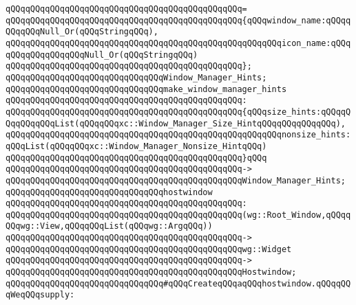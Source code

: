 \verb|qQQqqQQqqQQqqQQqqQQqqQQqqQQqqQQqqQQqqQQqqQQqqQQq=|\newline
\verb|qQQqqQQqqQQqqQQqqQQqqQQqqQQqqQQqqQQqqQQqqQQqqQQq{qQQqwindow_name:qQQqqQQqqQQqNull_Or(qQQqStringqQQq),|\newline
\verb|qQQqqQQqqQQqqQQqqQQqqQQqqQQqqQQqqQQqqQQqqQQqqQQqqQQqqQQqicon_name:qQQqqQQqqQQqqQQqqQQqNull_Or(qQQqStringqQQq)|\newline
\verb|qQQqqQQqqQQqqQQqqQQqqQQqqQQqqQQqqQQqqQQqqQQqqQQq};|\newline
\newline
\verb|qQQqqQQqqQQqqQQqqQQqqQQqqQQqqQQqWindow_Manager_Hints;|\newline
\newline
\verb|qQQqqQQqqQQqqQQqqQQqqQQqqQQqqQQqmake_window_manager_hints|\newline
\verb|qQQqqQQqqQQqqQQqqQQqqQQqqQQqqQQqqQQqqQQqqQQqqQQq:|\newline
\verb|qQQqqQQqqQQqqQQqqQQqqQQqqQQqqQQqqQQqqQQqqQQqqQQq{qQQqsize_hints:qQQqqQQqqQQqqQQqList(qQQqqQQqxc::Window_Manager_Size_HintqQQqqQQqqQQqqQQq),|\newline
\verb|qQQqqQQqqQQqqQQqqQQqqQQqqQQqqQQqqQQqqQQqqQQqqQQqqQQqqQQqnonsize_hints:qQQqList(qQQqqQQqxc::Window_Manager_Nonsize_HintqQQq)|\newline
\verb|qQQqqQQqqQQqqQQqqQQqqQQqqQQqqQQqqQQqqQQqqQQqqQQq}qQQq|\newline
\verb|qQQqqQQqqQQqqQQqqQQqqQQqqQQqqQQqqQQqqQQqqQQqqQQq->|\newline
\verb|qQQqqQQqqQQqqQQqqQQqqQQqqQQqqQQqqQQqqQQqqQQqqQQqWindow_Manager_Hints;|\newline
\newline
\verb|qQQqqQQqqQQqqQQqqQQqqQQqqQQqqQQqhostwindow|\newline
\verb|qQQqqQQqqQQqqQQqqQQqqQQqqQQqqQQqqQQqqQQqqQQqqQQq:|\newline
\verb|qQQqqQQqqQQqqQQqqQQqqQQqqQQqqQQqqQQqqQQqqQQqqQQq(wg::Root_Window,qQQqqQQqwg::View,qQQqqQQqList(qQQqwg::ArgqQQq))|\newline
\verb|qQQqqQQqqQQqqQQqqQQqqQQqqQQqqQQqqQQqqQQqqQQqqQQq->|\newline
\verb|qQQqqQQqqQQqqQQqqQQqqQQqqQQqqQQqqQQqqQQqqQQqqQQqwg::Widget|\newline
\verb|qQQqqQQqqQQqqQQqqQQqqQQqqQQqqQQqqQQqqQQqqQQqqQQq->|\newline
\verb|qQQqqQQqqQQqqQQqqQQqqQQqqQQqqQQqqQQqqQQqqQQqqQQqHostwindow;|\newline
\newline
\verb|qQQqqQQqqQQqqQQqqQQqqQQqqQQqqQQq#qQQqCreateqQQqaqQQqhostwindow.qQQqqQQqWeqQQqsupply:|\newline
